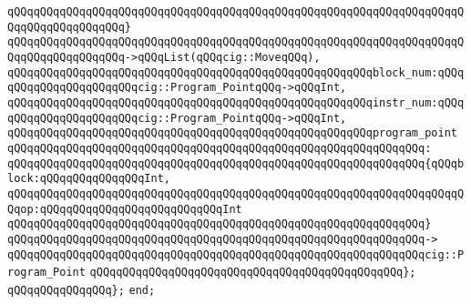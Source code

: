 \verb|qQQqqQQqqQQqqQQqqQQqqQQqqQQqqQQqqQQqqQQqqQQqqQQqqQQqqQQqqQQqqQQqqQQqqQQqqQQqqQQqqQQqqQQq}|\newline
\verb|qQQqqQQqqQQqqQQqqQQqqQQqqQQqqQQqqQQqqQQqqQQqqQQqqQQqqQQqqQQqqQQqqQQqqQQqqQQqqQQqqQQqqQQq->qQQqList(qQQqcig::MoveqQQq),|\newline
\newline
\verb|qQQqqQQqqQQqqQQqqQQqqQQqqQQqqQQqqQQqqQQqqQQqqQQqqQQqqQQqblock_num:qQQqqQQqqQQqqQQqqQQqqQQqcig::Program_PointqQQq->qQQqInt,|\newline
\verb|qQQqqQQqqQQqqQQqqQQqqQQqqQQqqQQqqQQqqQQqqQQqqQQqqQQqqQQqinstr_num:qQQqqQQqqQQqqQQqqQQqqQQqcig::Program_PointqQQq->qQQqInt,|\newline
\newline
\verb|qQQqqQQqqQQqqQQqqQQqqQQqqQQqqQQqqQQqqQQqqQQqqQQqqQQqqQQqprogram_point|\newline
\verb|qQQqqQQqqQQqqQQqqQQqqQQqqQQqqQQqqQQqqQQqqQQqqQQqqQQqqQQqqQQqqQQq:|\newline
\verb|qQQqqQQqqQQqqQQqqQQqqQQqqQQqqQQqqQQqqQQqqQQqqQQqqQQqqQQqqQQqqQQq{qQQqblock:qQQqqQQqqQQqqQQqInt,|\newline
\verb|qQQqqQQqqQQqqQQqqQQqqQQqqQQqqQQqqQQqqQQqqQQqqQQqqQQqqQQqqQQqqQQqqQQqqQQqop:qQQqqQQqqQQqqQQqqQQqqQQqqQQqInt|\newline
\verb|qQQqqQQqqQQqqQQqqQQqqQQqqQQqqQQqqQQqqQQqqQQqqQQqqQQqqQQqqQQqqQQq}|\newline
\verb|qQQqqQQqqQQqqQQqqQQqqQQqqQQqqQQqqQQqqQQqqQQqqQQqqQQqqQQqqQQqqQQq->|\newline
\verb|qQQqqQQqqQQqqQQqqQQqqQQqqQQqqQQqqQQqqQQqqQQqqQQqqQQqqQQqqQQqqQQqcig::Program_Point|\newline
\verb|qQQqqQQqqQQqqQQqqQQqqQQqqQQqqQQqqQQqqQQqqQQqqQQq};|\newline
\newline
\verb|qQQqqQQqqQQqqQQq};|\newline
\verb|end;|\newline

